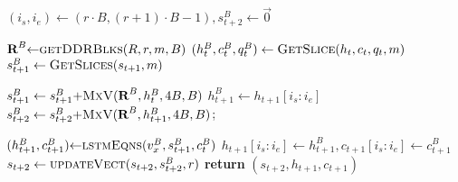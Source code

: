 \begin{algorithm}[H]
\begin{algorithmic}[1]
		\label{alg:UpDiagReuse}
		\label{alg:UpDiag_outFor} 
		\State $(i_s,i_e) \gets (r{\cdot}B,(r{+}1){\cdot}B{-}1),  s^B_{t+2} \gets \vec{0}$
		
		 \label{alg:UpDiag_inFor} 
		\State $\textbf{R}^B {\gets}\Call{getDDRBlks}{R,r,m,B}$ \label{alg:UpDiag_GetDDRBlks}   
        \State $(h^B_t,c^B_t,q^B_t)\gets \Call{GetSlice}{h_t,c_t,q_t,m}$ \label{alg:UpDiag_GetSlice}
        \State $s^B_{t+1}\gets \Call{GetSlices}{s_{t+1},m}$ \label{alg:UpDiag_GetSlices}
 
		\State $s^B_{t+1}\gets s^B_{t+1}{+}\Call{MxV}{\textbf{R}^B,h^B_t,4B,B}$\label{alg:UpDiag_ReuseR1} 
		\State $h^B_{t+1}\gets h_{t+1}\left [i_s\colon i_e\right ]$
		\State $s^B_{t+2}\gets s^B_{t+2}{+}\Call{MxV}{\textbf{R}^B,h_{t+1}^B, 4B,B}$; \label{alg:UpDiag_ReuseR2}   
		\EndFor
		
		\State$(h^B_{t+1},c^B_{t+1}){\gets}\Call{lstmEqns}{v^B_x,s^B_{t+1},c^B_t}$ \label{alg:UpDiag_LstmEq}
		\State $h_{t+1}\left[i_s\colon i_e\right ]\gets h^B_{t+1}, c_{t+1}\left[i_s\colon i_e\right ]\gets c^B_{t+1}$ \label{alg:UpDiag_UpdateH}
		\State $s_{t+2}\gets \Call{updateVect}{s_{t+2},s_{t+2}^B,r}$        
		\EndFor    
		\State \textbf{return} $(s_{t+2},h_{t+1},c_{t+1})$	
		\EndProcedure
	\end{algorithmic}
\end{algorithm}


